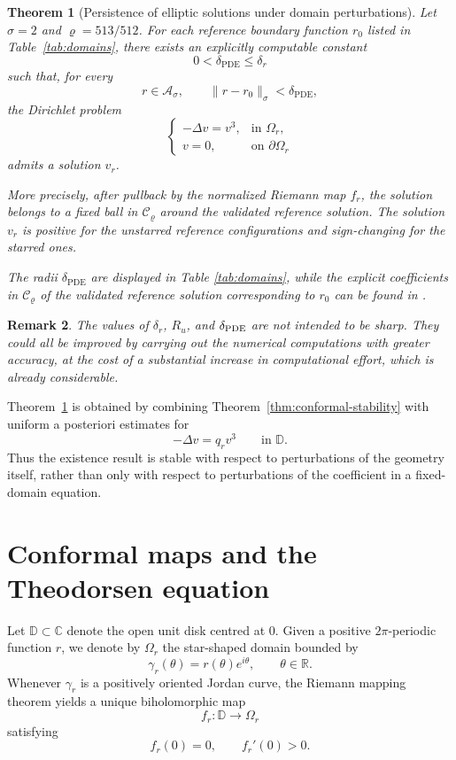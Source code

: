 \documentclass[11pt,a4paper]{amsart}
\newtheorem{theorem}{Theorem}[section]
\newtheorem{remark}[theorem]{Remark}
\begin{document}
\begin{theorem}[Persistence of elliptic solutions under domain
	perturbations]\label{thm:elliptic-stability}
	Let $\sigma=2$ and $\varrho=513/512$.
	For each reference boundary function $r_0$ listed in
	Table~\ref{tab:domains}, there exists an explicitly computable
	constant
	\[
	0<\delta_{\mathrm{PDE}}\leq\delta_r
	\]
	such that, for every
	\[
	r\in\mathcal A_\sigma,
	\qquad
	\|r-r_0\|_\sigma<\delta_{\mathrm{PDE}},
	\]
	the Dirichlet problem
	\[
	\begin{cases}
		-\Delta v=v^3,&\text{in }\Omega_r,\\
		v=0,&\text{on }\partial\Omega_r
	\end{cases}
	\]
	admits a solution $v_r$.
	
	More precisely, after pullback by the normalized Riemann map $f_r$,
	the solution belongs to a fixed ball in $\mathcal C_\varrho$ around
	the validated reference solution. The solution \(v_r\) is positive for the unstarred reference configurations and sign-changing for the starred ones.
	
	The radii $\delta_{\mathrm{PDE}}$ are displayed in Table \ref{tab:domains}, while the explicit coefficients in $\mathcal C_\varrho$ of the validated reference solution corresponding to $r_0$ can be found in \cite{program}.
\end{theorem}
\begin{remark}
The values of \(\delta_r\), \(R_u\), and \(\delta_{\rm PDE}\) are not intended to be sharp. They could all be improved by carrying out the numerical computations with greater accuracy, at the cost of a substantial increase in computational effort, which is already considerable.\end{remark}
Theorem~\ref{thm:elliptic-stability} is obtained by combining
Theorem~\ref{thm:conformal-stability} with uniform a posteriori
estimates for
\[
-\Delta v=q_r v^3\qquad\text{in }\mathbb D.
\]
Thus the existence result is stable with respect to perturbations of
the geometry itself, rather than only with respect to perturbations of
the coefficient in a fixed-domain equation.

\section{Conformal maps and the Theodorsen equation}
\label{sec:theo}

Let $\mathbb D\subset\mathbb C$ denote the open unit disk centred at 0. Given a
positive $2\pi$-periodic function $r$, we denote by $\Omega_r$ the
star-shaped domain bounded by
\begin{equation}\label{eq:polarboundary}
	\gamma_r(\theta)
	=
	r(\theta)e^{i\theta},
	\qquad
	\theta\in\mathbb R.
\end{equation}
Whenever $\gamma_r$ is a positively oriented Jordan curve, the Riemann
mapping theorem yields a unique biholomorphic map
\[
f_r:\mathbb D\longrightarrow\Omega_r
\]
satisfying
\[
f_r(0)=0,
\qquad
f_r'(0)>0.
\]
\end{document}
